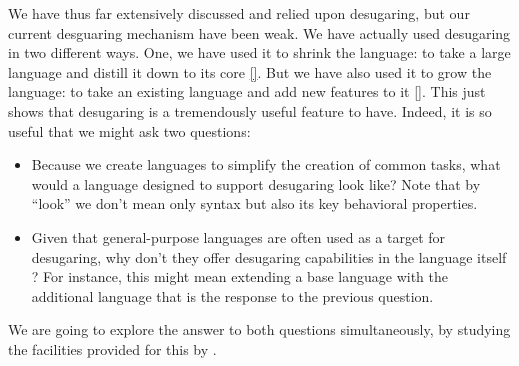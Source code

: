 \secdown

We have thus far extensively discussed and relied upon desugaring, but our
current desguaring mechanism have been weak. We have actually used desugaring in
two different ways. One, we have used it to shrink the language: to take a large
language and distill it down to its core \ref{}. But we have also used it to
grow the language: to take an existing language and add new features to it
\ref{}. This just shows that desugaring is a tremendously useful feature to
have. Indeed, it is so useful that we might ask two questions:
\begin{itemize}
  \item 
Because we create languages to simplify the creation of common tasks, what would
a language designed to support desugaring look like? Note that by “look” we
don’t mean only syntax but also its key behavioral properties.
  \item 
Given that general-purpose languages are often used as a target for desugaring,
why don’t they offer desugaring capabilities in the language itself ? For
instance, this might mean extending a base language with the additional language
that is the response to the previous question.
\end{itemize}
We are going to explore the answer to both questions simultaneously, by studying
the facilities provided for this by \racket.








\secup
